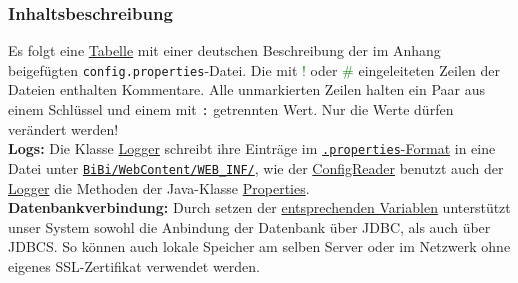 \documentclass{article}
\begin{document}
\subsubsection{Inhaltsbeschreibung}
\hypertarget{propSchema}{}
Es folgt eine \hyperlink{tabelle}{Tabelle} mit einer deutschen Beschreibung der im Anhang beigefügten \texttt{config.properties}-Datei. Die mit \textcolor{green}{!} oder \textcolor{green}{\#} eingeleiteten Zeilen der Dateien enthalten Kommentare. Alle unmarkierten Zeilen halten ein Paar aus einem Schlüssel und einem mit \texttt{:} getrennten Wert. Nur die Werte dürfen verändert werden! \\
\textbf{Logs:} Die Klasse \hyperlink{ConfigReader}{Logger} schreibt ihre Einträge im \hyperlink{https://de.wikipedia.org/wiki/Java-Properties-Datei}{\texttt{.properties}-Format} in eine Datei unter \hyperlink{Paketstruktur}{\texttt{BiBi/WebContent/WEB\_INF/}}, wie der \hyperlink{ConfigReader}{ConfigReader} benutzt auch der \hyperlink{ConfigReader}{Logger} die Methoden der Java-Klasse \hyperlink{https://docs.oracle.com/javase/7/docs/api/java/util/Properties.html}{Properties}.\\
\textbf{Datenbankverbindung:} Durch setzen der \hyperlink{DBSSL}{entsprechenden Variablen} unterstützt unser System sowohl die Anbindung der Datenbank über JDBC, als auch über JDBCS. So können auch lokale Speicher am selben Server oder im Netzwerk ohne eigenes SSL-Zertifikat verwendet werden. \\
\end{document}
